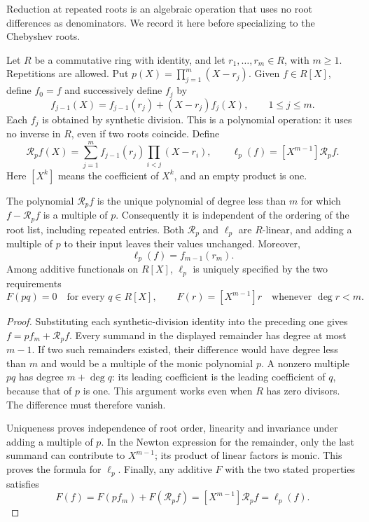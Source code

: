 Reduction at repeated roots is an algebraic operation that uses no
root differences as denominators. We record it here before
specializing to the Chebyshev roots.

Let \(R\) be a commutative ring with identity, and let
\(r_1,\ldots,r_m\in R\), with \(m\ge1\). Repetitions are allowed.
Put \(p(X)=\prod_{j=1}^m(X-r_j)\). Given \(f\in R[X]\), define
\(f_0=f\) and successively define \(f_j\) by
\[
 f_{j-1}(X)=f_{j-1}(r_j)+(X-r_j)f_j(X),\qquad 1\le j\le m.
\]
Each \(f_j\) is obtained by synthetic division. This is a polynomial
operation: it uses no inverse in \(R\), even if two roots coincide.
Define
\[
 \mathcal R_p f(X)=
 \sum_{j=1}^m f_{j-1}(r_j)\prod_{i<j}(X-r_i),
 \qquad
 \ell_p(f)=[X^{m-1}]\mathcal R_p f.
\]
Here \([X^k]\) means the coefficient of \(X^k\), and an empty
product is one.

\begin{proposition}
\label{prop:canonical-polynomial-remainder}
The polynomial \(\mathcal R_p f\) is the unique polynomial of degree
less than \(m\) for which \(f-\mathcal R_p f\) is a multiple of
\(p\). Consequently it is independent of the ordering of the root
list, including repeated entries. Both \(\mathcal R_p\) and
\(\ell_p\) are \(R\)-linear, and adding a multiple of \(p\) to
their input leaves their values unchanged. Moreover,
\[
 \ell_p(f)=f_{m-1}(r_m).
\]
Among additive functionals on \(R[X]\), \(\ell_p\) is uniquely
specified by the two requirements
\[
 F(pq)=0\quad\text{for every }q\in R[X],\qquad
 F(r)=[X^{m-1}]r\quad\text{whenever }\deg r<m.
\]
\end{proposition}

\begin{proof}
Substituting each synthetic-division identity into the preceding one
gives \(f=p f_m+\mathcal R_p f\). Every summand in the displayed
remainder has degree at most \(m-1\). If two such remainders existed,
their difference would have degree less than \(m\) and would be a
multiple of the monic polynomial \(p\). A nonzero multiple \(pq\)
has degree \(m+\deg q\): its leading coefficient is the leading
coefficient of \(q\), because that of \(p\) is one. This argument
works even when \(R\) has zero divisors. The difference must therefore
vanish.

Uniqueness proves independence of root order, linearity and invariance
under adding a multiple of \(p\). In the Newton expression for the
remainder, only the last summand can contribute to \(X^{m-1}\);
its product of linear factors is monic. This proves the formula for
\(\ell_p\). Finally, any additive \(F\) with the two stated
properties satisfies
\[
 F(f)=F(pf_m)+F(\mathcal R_p f)
      =[X^{m-1}]\mathcal R_p f=\ell_p(f).
\]
\end{proof}

